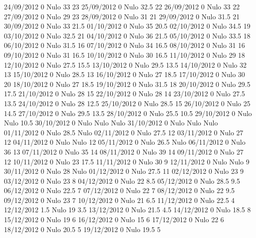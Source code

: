 24/09/2012  0     Nulo    33     23 
25/09/2012  0     Nulo    32.5   22 
26/09/2012  0     Nulo    33     22 
27/09/2012  0     Nulo    29     23 
28/09/2012  0     Nulo    31     21 
29/09/2012  0     Nulo    31.5   21 
30/09/2012  0     Nulo    33     21.5 
01/10/2012  0     Nulo    35     20.5 
02/10/2012  0     Nulo    34.5   19 
03/10/2012  0     Nulo    32.5   21 
04/10/2012  0     Nulo    36     21.5 
05/10/2012  0     Nulo    33.5   18 
06/10/2012  0     Nulo    31.5   16 
07/10/2012  0     Nulo    34     16.5 
08/10/2012  0     Nulo    31     16 
09/10/2012  0     Nulo    31     16.5 
10/10/2012  0     Nulo    30     16.5 
11/10/2012  0     Nulo    29     18 
12/10/2012  0     Nulo    27.5   15.5 
13/10/2012  0     Nulo    29.5   13.5 
14/10/2012  0     Nulo    32     13 
15/10/2012  0     Nulo    28.5   13 
16/10/2012  0     Nulo    27     18.5 
17/10/2012  0     Nulo    30     20 
18/10/2012  0     Nulo    27     18.5 
19/10/2012  0     Nulo    31.5   18 
20/10/2012  0     Nulo    29.5   17.5 
21/10/2012  0     Nulo    28     15 
22/10/2012  0     Nulo    28     14 
23/10/2012  0     Nulo    27.5   13.5 
24/10/2012  0     Nulo    28     12.5 
25/10/2012  0     Nulo    28.5   15 
26/10/2012  0     Nulo    25     14.5 
27/10/2012  0     Nulo    29.5   13.5 
28/10/2012  0     Nulo    25.5   10.5 
29/10/2012  0     Nulo   Nulo    10.5 
30/10/2012  0     Nulo   Nulo   Nulo
31/10/2012  0     Nulo   Nulo   Nulo
01/11/2012  0     Nulo    28.5  Nulo
02/11/2012  0     Nulo    27.5   12 
03/11/2012  0     Nulo    27     12 
04/11/2012  0     Nulo   Nulo    12 
05/11/2012  0     Nulo    26.5  Nulo
06/11/2012  0     Nulo    36     13 
07/11/2012  0     Nulo    35     14 
08/11/2012  0     Nulo    39     14 
09/11/2012  0     Nulo    27     12 
10/11/2012  0     Nulo    23     17.5 
11/11/2012  0     Nulo    30     9 
12/11/2012  0     Nulo   Nulo    9 
30/11/2012  0     Nulo    28    Nulo
01/12/2012  0     Nulo    27.5   11 
02/12/2012  0     Nulo    23     9 
03/12/2012  0     Nulo    23     8 
04/12/2012  0     Nulo    22     8.5 
05/12/2012  0     Nulo    28.5   9.5 
06/12/2012  0     Nulo    22.5   7 
07/12/2012  0     Nulo    22     7 
08/12/2012  0     Nulo    22     9.5 
09/12/2012  0     Nulo    23     7 
10/12/2012  0     Nulo    21     6.5 
11/12/2012  0     Nulo    22.5   4 
12/12/2012  1.5   Nulo    19     3.5 
13/12/2012  0     Nulo    21.5   4.5 
14/12/2012  0     Nulo    18.5   8 
15/12/2012  0     Nulo    19     6 
16/12/2012  0     Nulo    15     6 
17/12/2012  0     Nulo    22     6 
18/12/2012  0     Nulo    20.5   5 
19/12/2012  0     Nulo    19.5   5 
